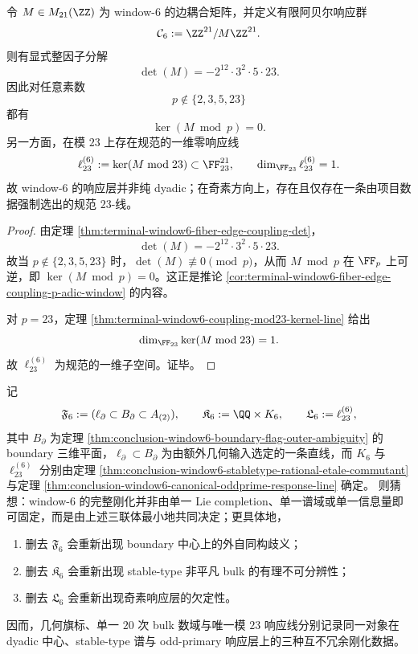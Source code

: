 \begin{theorem}[线性响应层的规范奇素线]\label{thm:conclusion-window6-canonical-oddprime-response-line}
令 \(M\in M_{21}(\ZZ)\) 为 window-\(6\) 的边耦合矩阵，并定义有限阿贝尔响应群
\[
\mathcal C_6:=\ZZ^{21}/M\ZZ^{21}.
\]
则有显式整因子分解
\[
\det(M)=-2^{12}\cdot 3^2\cdot 5\cdot 23.
\]
因此对任意素数
\[
p\notin\{2,3,5,23\}
\]
都有
\[
\ker(M\bmod p)=0.
\]
另一方面，在模 \(23\) 上存在规范的一维零响应线
\[
\ell_{23}^{(6)}:=\ker(M\bmod 23)\subset \FF_{23}^{21},
\qquad
\dim_{\FF_{23}}\ell_{23}^{(6)}=1.
\]
故 window-\(6\) 的响应层并非纯 dyadic；在奇素方向上，存在且仅存在一条由项目数据强制选出的规范 \(23\)-线。
\end{theorem}
\begin{proof}
由定理 \ref{thm:terminal-window6-fiber-edge-coupling-det}，
\[
\det(M)=-2^{12}\cdot 3^2\cdot 5\cdot 23.
\]
故当 \(p\notin\{2,3,5,23\}\) 时，\(\det(M)\not\equiv 0\pmod p\)，从而 \(M\bmod p\) 在 \(\FF_p\) 上可逆，即 \(\ker(M\bmod p)=0\)。这正是推论 \ref{cor:terminal-window6-fiber-edge-coupling-p-adic-window} 的内容。

对 \(p=23\)，定理 \ref{thm:terminal-window6-coupling-mod23-kernel-line} 给出
\[
\dim_{\FF_{23}}\ker(M\bmod 23)=1.
\]
故 \(\ell_{23}^{(6)}\) 为规范的一维子空间。证毕。
\end{proof}

\begin{conjecture}\label{conj:conclusion-window6-minimal-rigidifying-triad}
记
\[
\mathfrak F_6:=(\ell_\partial\subset B_\partial\subset A_{(2)}),
\qquad
\mathfrak K_6:=\QQ\times K_6,
\qquad
\mathfrak L_6:=\ell_{23}^{(6)},
\]
其中 \(B_\partial\) 为定理 \ref{thm:conclusion-window6-boundary-flag-outer-ambiguity} 的 boundary 三维平面，\(\ell_\partial\subset B_\partial\) 为由额外几何输入选定的一条直线，而 \(K_6\) 与 \(\ell_{23}^{(6)}\) 分别由定理 \ref{thm:conclusion-window6-stabletype-rational-etale-commutant} 与定理 \ref{thm:conclusion-window6-canonical-oddprime-response-line} 确定。
则猜想：window-\(6\) 的完整刚化并非由单一 Lie completion、单一谱域或单一信息量即可固定，而是由上述三联体最小地共同决定；更具体地，
\begin{enumerate}
  \item 删去 \(\mathfrak F_6\) 会重新出现 boundary 中心上的外自同构歧义；
  \item 删去 \(\mathfrak K_6\) 会重新出现 stable-type 非平凡 bulk 的有理不可分辨性；
  \item 删去 \(\mathfrak L_6\) 会重新出现奇素响应层的欠定性。
\end{enumerate}
因而，几何旗标、单一 \(20\) 次 bulk 数域与唯一模 \(23\) 响应线分别记录同一对象在 dyadic 中心、stable-type 谱与 odd-primary 响应层上的三种互不冗余刚化数据。
\end{conjecture}


